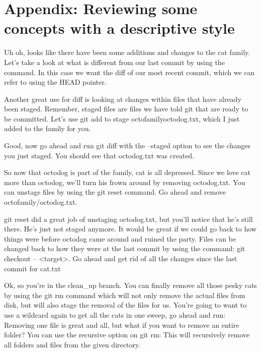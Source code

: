\section{Appendix: Reviewing some concepts with a descriptive style} \label{app:details}
\nl {}
\nl Uh oh, looks like there have been some additions and changes to the cat family. Let's take a look at what is different from our last commit by using the  command. In this case we want the diff of our most recent commit, which we can refer to using the HEAD pointer.
\nl{}

\bigskip
\nl {}
\nl Another great use for diff is looking at changes within files that have already been staged. Remember, staged files are files we have told git that are ready to be committed. Let's use git add to stage octofamily\/octodog.txt, which I just added to the family for you.
\nl{}

\nl Good, now go ahead and run git diff with the --staged option to see the changes you just staged. You should see that octodog.txt was created.
\nl {}

\bigskip
\nl {}
\nl So now that octodog is part of the family, cat is all depressed. Since we love cat more than octodog, we'll turn his frown around by removing octodog.txt.
\nl You can unstage files by using the git reset command. Go ahead and remove octofamily/octodog.txt.
\nl{}

\bigskip
\nl {}
\nl git reset did a great job of unstaging octodog.txt, but you'll notice that he's still there. He's just not staged anymore. It would be great if we could go back to how things were before octodog came around and ruined the party.
\nl Files can be changed back to how they were at the last commit by using the command: git checkout -- <target>. Go ahead and get rid of all the changes since the last commit for cat.txt
\nl {}

\bigskip
\nl {}
\nl Ok, so you're in the clean\_up branch. You can finally remove all those pesky cats by using the git rm command which will not only remove the actual files from disk, but will also stage the removal of the files for us.
\nl You're going to want to use a wildcard again to get all the cats in one sweep, go ahead and run:
\nl{}
\nl Removing one file is great and all, but what if you want to remove an entire folder? You can use the recursive option on git rm:
\nl {}
\nl This will recursively remove all folders and files from the given directory.

